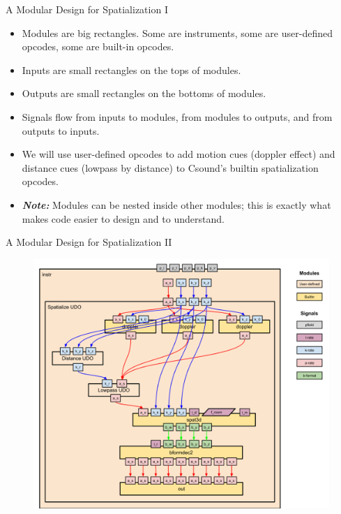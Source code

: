 \documentclass{beamer}
\begin{document}
    \begin{frame}{A Modular Design for Spatialization I}
        \begin{itemize}
            \item Modules are big rectangles. Some are instruments, some are user-defined opcodes, some are built-in opcodes.
            \item Inputs are small rectangles on the tops of modules.
            \item Outputs are small rectangles on the bottoms of modules.
            \item Signals flow from inputs to modules, from modules to outputs, and from outputs to inputs.
            \item We will use user-defined opcodes to add motion cues (doppler effect) and distance cues (lowpass by distance) to Csound's builtin spatialization opcodes.
            \item \textit{\textbf{Note:}} Modules can be nested inside other modules; this is exactly what makes code easier to design and to understand.
        \end{itemize}
    \end{frame}

    \begin{frame}{A Modular Design for Spatialization II}
        \begin{figure}
            \centerline{\includegraphics[height = 0.66\textwidth]{Spatialization}}
        \end{figure}        
    \end{frame}
    
\end{document}
